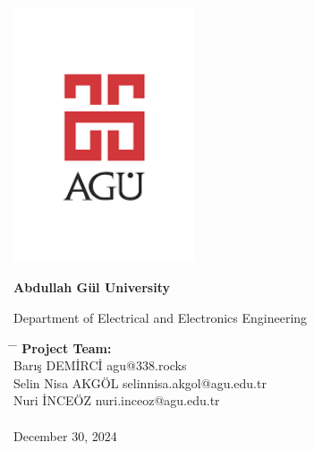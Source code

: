 \begin{center}
	\includegraphics[width=0.4\textwidth]{assets/agu.png}

	\Huge
	\textbf{Abdullah Gül University}

	\vspace{0.3cm}
	Department of Electrical and Electronics Engineering

	\vspace{1cm}
	\Huge
	\textbf{\paperTitle}

	\vspace{0.3cm}
	\Huge
	\paperSubTitle{}

	\vspace{0.8cm}
	\large
	\vspace{0.5cm}
	\LARGE
	\vspace{1.5cm}
	\textbf{}
	\vfill
	\vspace{0.8cm}
	\Large
\end{center}

\begin{tabbing}
	\hspace*{1em}\= \hspace*{9em} \= \kill
	\> \textbf{Project Team:} \>  \\
	\> Barış DEMİRCİ \> agu@338.rocks \\
	\> Selin Nisa AKGÖL \> selinnisa.akgol@agu.edu.tr \\
	\> Nuri İNCEÖZ \> nuri.inceoz@agu.edu.tr \\
	\>  \\
	\> December 30, 2024 \\
\end{tabbing}
